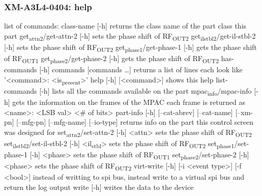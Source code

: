 \documentclass[11pt]{article}
\begin{document}
\subsubsection{XM-A3L4-0404: help}
\label{sec:org5ca8e4e}
list of commands:
  class-name [-h]
    returns the class name of the part class this part
  get\textsubscript{attn}\textsubscript{2}/get-attn-2 [-h]
    sets the phase shift of RF\textsubscript{OUT2}
  get\textsubscript{il}\textsubscript{stbl}\textsubscript{2}/get-il-stbl-2 [-h]
    sets the phase shift of RF\textsubscript{OUT2}
  get\textsubscript{phase}\textsubscript{1}/get-phase-1 [-h]
    gets the phase shift of RF\textsubscript{OUT1}
  get\textsubscript{phase}\textsubscript{2}/get-phase-2 [-h]
    gets the phase shift of RF\textsubscript{OUT2}
  has-commands [-h] commands [commands \ldots{}]
    returns a list of lines each look like '<command>: <is\textsubscript{present}>'
  help [-h] [<command>]
    shows this help
  list-commands [-h]
    lists all the commands available on the part
  mpac\textsubscript{info}/mpac-info [-h]
    gets the information on the frames of the MPAC
    each frame is returned as <name>: <LSB val> <\# of bits>
  part-info  [-h] [--cat-abrev] [--cat-name] [--xm-pn] [--mfg-pn] [--mfg-name]
          [--io-type]
    returns info on the part this control screen was designed for
  set\textsubscript{attn}\textsubscript{2}/set-attn-2 [-h] <attn>
    sets the phase shift of RF\textsubscript{OUT2}
  set\textsubscript{il}\textsubscript{stbl}\textsubscript{2}/set-il-stbl-2 [-h] <il\textsubscript{stbl}>
    sets the phase shift of RF\textsubscript{OUT2}
  set\textsubscript{phase}\textsubscript{1}/set-phase-1 [-h] <phase>
    sets the phase shift of RF\textsubscript{OUT1}
  set\textsubscript{phase}\textsubscript{2}/set-phase-2 [-h] <phase>
    sets the phase shift of RF\textsubscript{OUT2}
  virt-write [-h] [-i <event type>] [-f <bool>]
    instead of writting to spi bus, instead write to a virtual spi bus
    and return the log output
  write [-h]
    writes the data to the device
\end{document}

